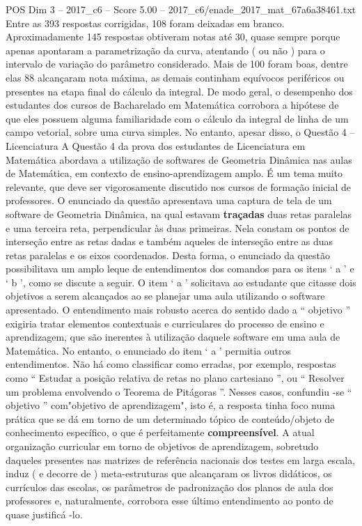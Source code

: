 \begin{textsample}{POS Dim 3 – 2017\_c6 – Score 5.00 – 2017\_c6/enade\_2017\_mat\_67a6a38461.txt}
Entre as 393 respostas corrigidas, 108 foram deixadas em branco.
Aproximadamente 145 respostas obtiveram notas até 30, quase sempre porque apenas apontaram a parametrização da curva, atentando ( ou não ) para o intervalo de variação do parâmetro considerado.
Mais de 100 foram boas, dentre elas 88 alcançaram nota máxima, as demais continham equívocos periféricos ou presentes na etapa final do cálculo da integral.
De modo geral, o desempenho dos estudantes dos cursos de Bacharelado em Matemática corrobora a hipótese de que eles possuem alguma familiaridade com o cálculo da integral de linha de um campo vetorial, sobre uma curva simples.
No entanto, apesar disso, o Questão 4 – Licenciatura A Questão 4 da prova dos estudantes de Licenciatura em Matemática abordava a utilização de softwares de Geometria Dinâmica nas aulas de Matemática, em contexto de ensino-aprendizagem amplo.
É um tema muito relevante, que deve ser vigorosamente discutido nos cursos de formação inicial de professores.
O enunciado da questão apresentava uma captura de tela de um software de Geometria Dinâmica, na qual estavam \textbf{traçadas} duas retas paralelas e uma terceira reta, perpendicular às duas primeiras.
Nela constam os pontos de interseção entre as retas dadas e também aqueles de interseção entre as duas retas paralelas e os eixos coordenados.
Desta forma, o enunciado da questão possibilitava um amplo leque de entendimentos dos comandos para os itens ‘ a ’ e ‘ b ’, como se discute a seguir.
O item ‘ a ’ solicitava ao estudante que citasse dois objetivos a serem alcançados ao se planejar uma aula utilizando o software apresentado.
O entendimento mais robusto acerca do sentido dado a “ objetivo ” exigiria tratar elementos contextuais e curriculares do processo de ensino e aprendizagem, que são inerentes à utilização daquele software em uma aula de Matemática.
No entanto, o enunciado do item ‘ a ’ permitia outros entendimentos.
Não há como classificar como erradas, por exemplo, respostas como “ Estudar a posição relativa de retas no plano cartesiano ”, ou “ Resolver um problema envolvendo o Teorema de Pitágoras ”.
Nesses casos, confundiu -se “ objetivo ” com"objetivo de aprendizagem", isto é, a resposta tinha foco numa prática que se dá em torno de um determinado tópico de conteúdo/objeto de conhecimento específico, o que é perfeitamente \textbf{compreensível}.
A atual organização curricular em torno de objetivos de aprendizagem, sobretudo daqueles presentes nas matrizes de referência nacionais dos testes em larga escala, induz ( e decorre de ) meta-estruturas que alcançaram os livros didáticos, os currículos das escolas, os parâmetros de padronização dos planos de aula dos professores e, naturalmente, corrobora esse último entendimento ao ponto de quase justificá -lo.

\end{textsample}
